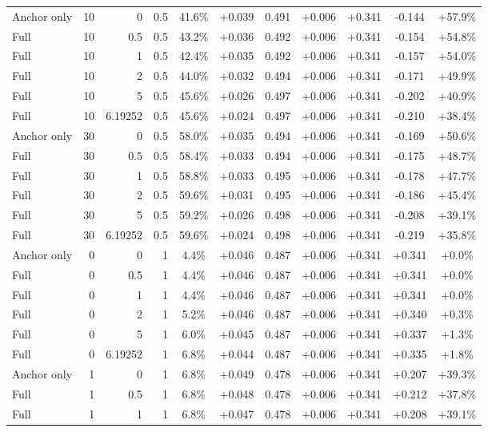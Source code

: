 \begin{table}[htbp]
\begin{tabular}{lrrrccccccc}
Anchor only & 10 & 0 & 0.5 & 41.6\% & +0.039 & 0.491 & +0.006 & +0.341 & -0.144 & +57.9\% \\
Full & 10 & 0.5 & 0.5 & 43.2\% & +0.036 & 0.492 & +0.006 & +0.341 & -0.154 & +54.8\% \\
Full & 10 & 1 & 0.5 & 42.4\% & +0.035 & 0.492 & +0.006 & +0.341 & -0.157 & +54.0\% \\
Full & 10 & 2 & 0.5 & 44.0\% & +0.032 & 0.494 & +0.006 & +0.341 & -0.171 & +49.9\% \\
Full & 10 & 5 & 0.5 & 45.6\% & +0.026 & 0.497 & +0.006 & +0.341 & -0.202 & +40.9\% \\
Full & 10 & 6.19252 & 0.5 & 45.6\% & +0.024 & 0.497 & +0.006 & +0.341 & -0.210 & +38.4\% \\
Anchor only & 30 & 0 & 0.5 & 58.0\% & +0.035 & 0.494 & +0.006 & +0.341 & -0.169 & +50.6\% \\
Full & 30 & 0.5 & 0.5 & 58.4\% & +0.033 & 0.494 & +0.006 & +0.341 & -0.175 & +48.7\% \\
Full & 30 & 1 & 0.5 & 58.8\% & +0.033 & 0.495 & +0.006 & +0.341 & -0.178 & +47.7\% \\
Full & 30 & 2 & 0.5 & 59.6\% & +0.031 & 0.495 & +0.006 & +0.341 & -0.186 & +45.4\% \\
Full & 30 & 5 & 0.5 & 59.2\% & +0.026 & 0.498 & +0.006 & +0.341 & -0.208 & +39.1\% \\
Full & 30 & 6.19252 & 0.5 & 59.6\% & +0.024 & 0.498 & +0.006 & +0.341 & -0.219 & +35.8\% \\
Anchor only & 0 & 0 & 1 & 4.4\% & +0.046 & 0.487 & +0.006 & +0.341 & +0.341 & +0.0\% \\
Full & 0 & 0.5 & 1 & 4.4\% & +0.046 & 0.487 & +0.006 & +0.341 & +0.341 & +0.0\% \\
Full & 0 & 1 & 1 & 4.4\% & +0.046 & 0.487 & +0.006 & +0.341 & +0.341 & +0.0\% \\
Full & 0 & 2 & 1 & 5.2\% & +0.046 & 0.487 & +0.006 & +0.341 & +0.340 & +0.3\% \\
Full & 0 & 5 & 1 & 6.0\% & +0.045 & 0.487 & +0.006 & +0.341 & +0.337 & +1.3\% \\
Full & 0 & 6.19252 & 1 & 6.8\% & +0.044 & 0.487 & +0.006 & +0.341 & +0.335 & +1.8\% \\
Anchor only & 1 & 0 & 1 & 6.8\% & +0.049 & 0.478 & +0.006 & +0.341 & +0.207 & +39.3\% \\
Full & 1 & 0.5 & 1 & 6.8\% & +0.048 & 0.478 & +0.006 & +0.341 & +0.212 & +37.8\% \\
Full & 1 & 1 & 1 & 6.8\% & +0.047 & 0.478 & +0.006 & +0.341 & +0.208 & +39.1\% \\

\end{tabular}
\end{table}
